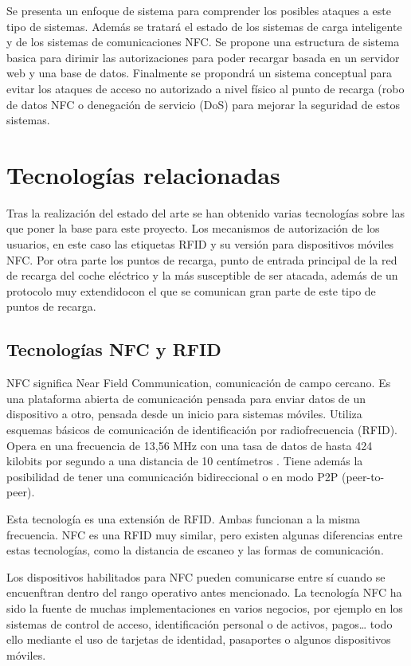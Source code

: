 \documentclass[12pt,a4paper,onecolumn,oneside]{report}
\begin{document}
Se presenta un enfoque de sistema para comprender los posibles ataques a este tipo de sistemas. Además se tratará el estado de los sistemas de carga inteligente y de los sistemas de comunicaciones NFC. Se propone una estructura de sistema basica para dirimir las autorizaciones para poder recargar basada en un servidor web y una base de datos. Finalmente se propondrá un sistema conceptual para evitar los ataques de acceso no autorizado a nivel físico al punto de recarga (robo de datos NFC o denegación de servicio (DoS) para mejorar la seguridad de estos sistemas.




\section{Tecnologías relacionadas}

Tras la realización del estado del arte se han obtenido varias tecnologías sobre las que poner la base para este proyecto. Los mecanismos de autorización de los usuarios, en este caso las etiquetas RFID y su versión para dispositivos móviles NFC. Por otra parte los puntos de recarga, punto de entrada principal de la red de recarga del coche eléctrico y la más susceptible de ser atacada, además de un protocolo muy extendidocon el que se comunican gran parte de este tipo de puntos de recarga.

\subsection{Tecnologías NFC y RFID}
\label{Tecnologías NFC y RFID}

NFC significa Near Field Communication, comunicación de campo cercano. Es una plataforma abierta de comunicación pensada para enviar datos de un dispositivo a otro, pensada desde un inicio para sistemas móviles. Utiliza esquemas básicos de comunicación de identificación por radiofrecuencia (RFID). Opera en una frecuencia de 13,56 MHz con una tasa de datos de hasta 424 kilobits por segundo a una distancia de 10 centímetros \cite{uno}. Tiene además la posibilidad de tener una comunicación bidireccional o en modo P2P (peer-to-peer).

Esta tecnología es una extensión de RFID. Ambas funcionan a la misma frecuencia. NFC es una RFID muy similar, pero existen algunas diferencias entre estas tecnologías, como la distancia de escaneo y las formas de comunicación. 

Los dispositivos habilitados para NFC pueden comunicarse entre sí cuando se encuenftran dentro del rango operativo antes mencionado. La tecnología NFC ha sido la fuente de muchas implementaciones en varios negocios, por ejemplo en los sistemas de control de acceso, identificación personal o de activos, pagos… todo ello mediante el uso de tarjetas de identidad, pasaportes o algunos dispositivos móviles.
\end{document}
